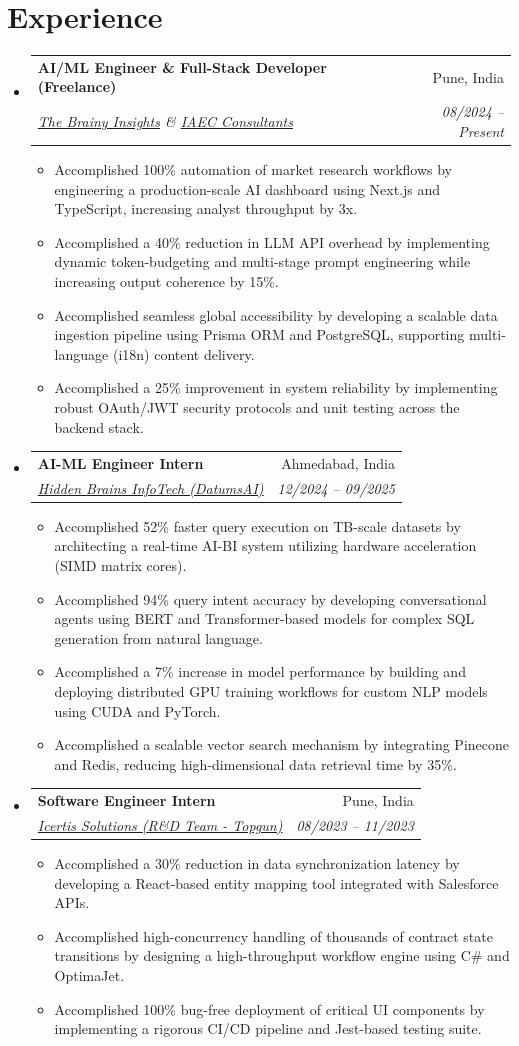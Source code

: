 \documentclass[10pt,a4paper]{article}
\makeatletter
\newcommand{\resumeItem}[1]{\item\small{#1}}
\newcommand{\resumeSubheading}[4]{
  \vspace{-1pt}\item
    \begin{tabular*}{1.0\textwidth}[t]{l@{\extracolsep{\fill}}r}
      \textbf{#1} & #2 \\
      \textit{\small#3} & \textit{\small #4} \\
    \end{tabular*}\vspace{-5pt}
}
\makeatother
\begin{document}
\section{Experience}
\begin{itemize}[label={}]
    \resumeSubheading
      {AI/ML Engineer \& Full-Stack Developer (Freelance)}{Pune, India}
      {\href{https://thebrainyinsights.com}{The Brainy Insights} \& \href{https://iaec.co.in}{IAEC Consultants}}{08/2024 -- Present}
      \begin{itemize}
        \resumeItem{Accomplished 100\% automation of market research workflows by engineering a production-scale AI dashboard using Next.js and TypeScript, increasing analyst throughput by 3x.}
        \resumeItem{Accomplished a 40\% reduction in LLM API overhead by implementing dynamic token-budgeting and multi-stage prompt engineering while increasing output coherence by 15\%.}
        \resumeItem{Accomplished seamless global accessibility by developing a scalable data ingestion pipeline using Prisma ORM and PostgreSQL, supporting multi-language (i18n) content delivery.}
        \resumeItem{Accomplished a 25\% improvement in system reliability by implementing robust OAuth/JWT security protocols and unit testing across the backend stack.}
      \end{itemize}

    \resumeSubheading
      {AI-ML Engineer Intern}{Ahmedabad, India}
      {\href{https://hiddenbrains.com}{Hidden Brains InfoTech (DatumsAI)}}{12/2024 -- 09/2025}
      \begin{itemize}
        \resumeItem{Accomplished 52\% faster query execution on TB-scale datasets by architecting a real-time AI-BI system utilizing hardware acceleration (SIMD matrix cores).}
        \resumeItem{Accomplished 94\% query intent accuracy by developing conversational agents using BERT and Transformer-based models for complex SQL generation from natural language.}
        \resumeItem{Accomplished a 7\% increase in model performance by building and deploying distributed GPU training workflows for custom NLP models using CUDA and PyTorch.}
        \resumeItem{Accomplished a scalable vector search mechanism by integrating Pinecone and Redis, reducing high-dimensional data retrieval time by 35\%.}
      \end{itemize}

    \resumeSubheading
      {Software Engineer Intern}{Pune, India}
      {\href{https://icertis.com}{Icertis Solutions (R\&D Team - Topgun)}}{08/2023 -- 11/2023}
      \begin{itemize}
        \resumeItem{Accomplished a 30\% reduction in data synchronization latency by developing a React-based entity mapping tool integrated with Salesforce APIs.}
        \resumeItem{Accomplished high-concurrency handling of thousands of contract state transitions by designing a high-throughput workflow engine using C\# and OptimaJet.}
        \resumeItem{Accomplished 100\% bug-free deployment of critical UI components by implementing a rigorous CI/CD pipeline and Jest-based testing suite.}
      \end{itemize}
\end{itemize}
\end{document}
